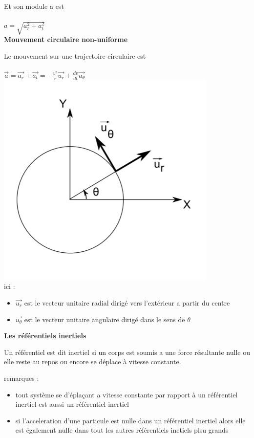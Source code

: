 \documentclass[]{article}
\begin{document}
Et son module a est\\\\
\indent \indent $a = \sqrt{a_r^2 + a_t^2}$\\

\noindent \textbf{Mouvement circulaire non-uniforme}

Le mouvement sur une trajectoire circulaire est\\\\
\indent \indent $\overrightarrow{a} = \overrightarrow{a_r} + \overrightarrow{a_t} = -\frac{v^2}{r}\overrightarrow{u_r}+\frac{dv}{dt}\overrightarrow{u_{\theta}}$\\

\includegraphics[scale = 0.65]{MCNU}\\

ici :
\begin{itemize}
\item $\overrightarrow{u_r}$ est le vecteur unitaire radial dirigé vers l'extérieur a partir du centre
\item $\overrightarrow{u_{\theta}}$ est le vecteur unitaire angulaire dirigé dans le sens de $\theta$
\end{itemize}
\textbf{Les référentiels inertiels}

Un référentiel est dit inertiel si un corps est soumis a une force résultante nulle ou elle reste au repos ou encore se déplace à vitesse constante.

remarques :
\begin{itemize}
\item tout système se d'éplaçant a vitesse constante par rapport à un référentiel inertiel est aussi un référentiel inertiel
  \item si l'acceleration d'une particule est nulle dans un référentiel inertiel alors elle est également nulle dans tout les autres référentiels inetiels plsu grands
\end{itemize}
\end{document}
